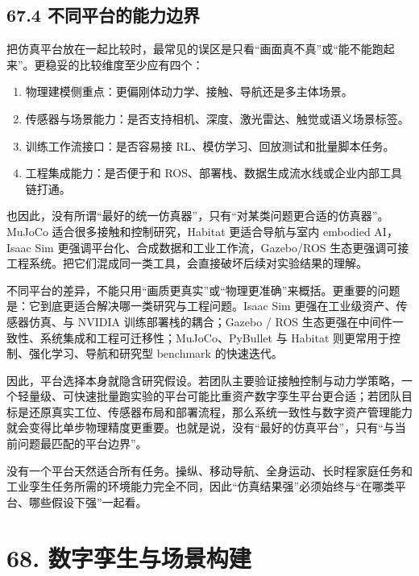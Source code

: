 \subsection*{67.4 不同平台的能力边界}


把仿真平台放在一起比较时，最常见的误区是只看“画面真不真”或“能不能跑起来”。更稳妥的比较维度至少应有四个：

\begin{enumerate}
\item 物理建模侧重点：更偏刚体动力学、接触、导航还是多主体场景。
\item 传感器与场景能力：是否支持相机、深度、激光雷达、触觉或语义场景标签。
\item 训练工作流接口：是否容易接 RL、模仿学习、回放测试和批量脚本任务。
\item 工程集成能力：是否便于和 ROS、部署栈、数据生成流水线或企业内部工具链打通。
\end{enumerate}

也因此，没有所谓“最好的统一仿真器”，只有“对某类问题更合适的仿真器”。MuJoCo 适合很多接触和控制研究，Habitat 更适合导航与室内 embodied AI，Isaac Sim 更强调平台化、合成数据和工业工作流，Gazebo/ROS 生态更强调可接工程系统。把它们混成同一类工具，会直接破坏后续对实验结果的理解。

不同平台的差异，不能只用“画质更真实”或“物理更准确”来概括。更重要的问题是：它到底更适合解决哪一类研究与工程问题。Isaac Sim 更强在工业级资产、传感器仿真、与 NVIDIA 训练部署栈的耦合；Gazebo / ROS 生态更强在中间件一致性、系统集成和工程可迁移性；MuJoCo、PyBullet 与 Habitat 则更常用于控制、强化学习、导航和研究型 benchmark 的快速迭代。

因此，平台选择本身就隐含研究假设。若团队主要验证接触控制与动力学策略，一个轻量级、可快速批量跑实验的平台可能比重资产数字孪生平台更合适；若团队目标是还原真实工位、传感器布局和部署流程，那么系统一致性与数字资产管理能力就会变得比单步物理精度更重要。也就是说，没有“最好的仿真平台”，只有“与当前问题最匹配的平台边界”。

没有一个平台天然适合所有任务。操纵、移动导航、全身运动、长时程家庭任务和工业孪生任务所需的环境能力完全不同，因此“仿真结果强”必须始终与“在哪类平台、哪些假设下强”一起看。

\section*{68. 数字孪生与场景构建}

